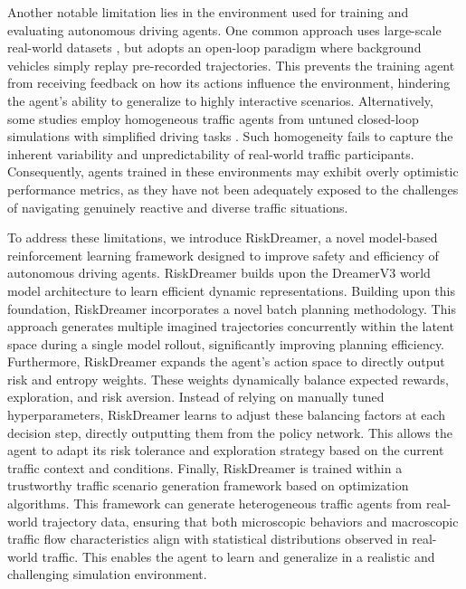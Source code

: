 Another notable limitation lies in the environment used for training and evaluating autonomous driving agents. One common approach uses large-scale real-world datasets \cite{nuplan}, \cite{WaymoMotion} but adopts an open-loop paradigm where background vehicles simply replay pre-recorded trajectories. This prevents the training agent from receiving feedback on how its actions influence the environment, hindering the agent's ability to generalize to highly interactive scenarios. Alternatively, some studies employ homogeneous traffic agents from untuned closed-loop simulations with simplified driving tasks \cite{FNI-RL}. Such homogeneity fails to capture the inherent variability and unpredictability of real-world traffic participants. Consequently, agents trained in these environments may exhibit overly optimistic performance metrics, as they have not been adequately exposed to the challenges of navigating genuinely reactive and diverse traffic situations.

To address these limitations, we introduce RiskDreamer, a novel model-based reinforcement learning framework designed to improve safety and efficiency of autonomous driving agents. RiskDreamer builds upon the DreamerV3 \cite{dreamerv3} world model architecture to learn efficient dynamic representations. Building upon this foundation, RiskDreamer incorporates a novel batch planning methodology. This approach generates multiple imagined trajectories concurrently within the latent space during a single model rollout, significantly improving planning efficiency. Furthermore, RiskDreamer expands the agent's action space to directly output risk and entropy weights. These weights dynamically balance expected rewards, exploration, and risk aversion. Instead of relying on manually tuned hyperparameters, RiskDreamer learns to adjust these balancing factors at each decision step, directly outputting them from the policy network. This allows the agent to adapt its risk tolerance and exploration strategy based on the current traffic context and conditions. Finally, RiskDreamer is trained within a trustworthy traffic scenario generation framework based on optimization algorithms. This framework can generate heterogeneous traffic agents from real-world trajectory data, ensuring that both microscopic behaviors and macroscopic traffic flow characteristics align with statistical distributions observed in real-world traffic. This enables the agent to learn and generalize in a realistic and challenging simulation environment.

